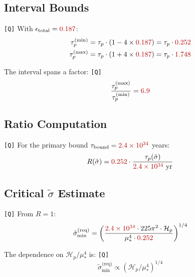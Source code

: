 \documentclass[11pt,a4paper]{article}
\newcommand{\Qval}[1]{\textcolor{red!70!black}{#1}}
\newcommand{\tagQ}{\textcolor{red!70!black}{\texttt{[Q]}}}
\theoremstyle{definition}
\begin{document}
\subsection{Interval Bounds}
\label{app:interval}

\tagQ{} With $\epsilon_{\text{total}} = \Qval{0.187}$:
\begin{align}
\label{eq:interval-lower}
\tau_p^{(\min)} &= \tau_p \cdot (1 - 4 \times \Qval{0.187}) = \tau_p \cdot \Qval{0.252} \\
\label{eq:interval-upper}
\tau_p^{(\max)} &= \tau_p \cdot (1 + 4 \times \Qval{0.187}) = \tau_p \cdot \Qval{1.748}
\end{align}

The interval spans a factor: \tagQ{}
\begin{equation}
\label{eq:interval-span}
\frac{\tau_p^{(\max)}}{\tau_p^{(\min)}} = \Qval{6.9}
\end{equation}

\subsection{Ratio Computation}
\label{app:ratio-comp}

\tagQ{} For the primary bound $\tau_{\text{bound}} = \Qval{2.4 \times 10^{34}}$ years:
\begin{equation}
\label{eq:ratio-form}
R(\tilde{\sigma}) = \Qval{0.252} \cdot \frac{\tau_p(\tilde{\sigma})}{\Qval{2.4 \times 10^{34}} \text{ yr}}
\end{equation}

\subsection{Critical $\tilde{\sigma}$ Estimate}
\label{app:crit-sigma}

\tagQ{} From $R = 1$:
\begin{equation}
\label{eq:crit-sigma}
\tilde{\sigma}_{\min}^{\text{(req)}} = \left(\frac{\Qval{2.4 \times 10^{34}} \cdot 225\pi^2 \cdot \mathcal{H}_p}{\mu_*^4 \cdot \Qval{0.252}}\right)^{1/4}
\end{equation}

The dependence on $\mathcal{H}_p/\mu_*^4$ is: \tagQ{}
\begin{equation}
\label{eq:crit-dep}
\tilde{\sigma}_{\min}^{\text{(req)}} \propto \left(\mathcal{H}_p/\mu_*^4\right)^{1/4}
\end{equation}

\end{document}
